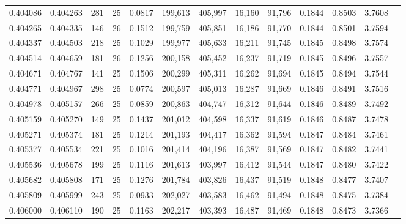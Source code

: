 \begin{tabular}{rrrrrrrrrrrrr}
0.404086 & 0.404263 & 281 &  25 &                                     0.0817 & 199,613 & 405,997 &  16,160 &  91,796 & 0.1844 & 0.8503 & 3.7608 \\
0.404265 & 0.404335 & 146 &  26 &                                     0.1512 & 199,759 & 405,851 &  16,186 &  91,770 & 0.1844 & 0.8501 & 3.7594 \\
0.404337 & 0.404503 & 218 &  25 &                                     0.1029 & 199,977 & 405,633 &  16,211 &  91,745 & 0.1845 & 0.8498 & 3.7574 \\
0.404514 & 0.404659 & 181 &  26 &                                     0.1256 & 200,158 & 405,452 &  16,237 &  91,719 & 0.1845 & 0.8496 & 3.7557 \\
0.404671 & 0.404767 & 141 &  25 &                                     0.1506 & 200,299 & 405,311 &  16,262 &  91,694 & 0.1845 & 0.8494 & 3.7544 \\
0.404771 & 0.404967 & 298 &  25 &                                     0.0774 & 200,597 & 405,013 &  16,287 &  91,669 & 0.1846 & 0.8491 & 3.7516 \\
0.404978 & 0.405157 & 266 &  25 &                                     0.0859 & 200,863 & 404,747 &  16,312 &  91,644 & 0.1846 & 0.8489 & 3.7492 \\
0.405159 & 0.405270 & 149 &  25 &                                     0.1437 & 201,012 & 404,598 &  16,337 &  91,619 & 0.1846 & 0.8487 & 3.7478 \\
0.405271 & 0.405374 & 181 &  25 &                                     0.1214 & 201,193 & 404,417 &  16,362 &  91,594 & 0.1847 & 0.8484 & 3.7461 \\
0.405377 & 0.405534 & 221 &  25 &                                     0.1016 & 201,414 & 404,196 &  16,387 &  91,569 & 0.1847 & 0.8482 & 3.7441 \\
0.405536 & 0.405678 & 199 &  25 &                                     0.1116 & 201,613 & 403,997 &  16,412 &  91,544 & 0.1847 & 0.8480 & 3.7422 \\
0.405682 & 0.405808 & 171 &  25 &                                     0.1276 & 201,784 & 403,826 &  16,437 &  91,519 & 0.1848 & 0.8477 & 3.7407 \\
0.405809 & 0.405999 & 243 &  25 &                                     0.0933 & 202,027 & 403,583 &  16,462 &  91,494 & 0.1848 & 0.8475 & 3.7384 \\
0.406000 & 0.406110 & 190 &  25 &                                     0.1163 & 202,217 & 403,393 &  16,487 &  91,469 & 0.1848 & 0.8473 & 3.7366 \\

\end{tabular}
